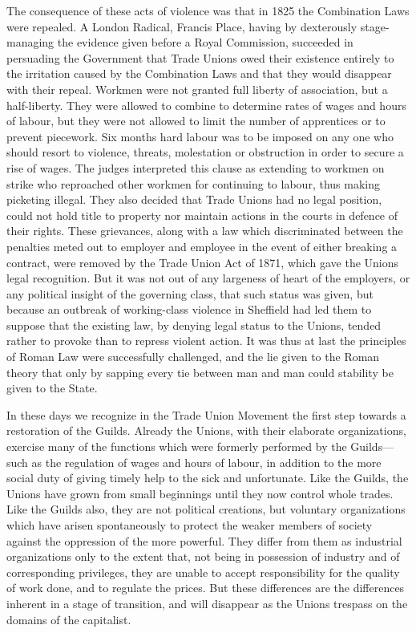 \documentclass{book}
\begin{document}
The consequence of these acts of violence was that in 1825 the Combination Laws were repealed. A London Radical, Francis Place, having by dexterously stage-managing the evidence given before a Royal Commission, succeeded in persuading the Government that Trade Unions owed their existence entirely to the irritation caused by the Combination Laws and that they would disappear with their repeal. Workmen were not granted full liberty of association, but a half-liberty. They were allowed to combine to determine rates of wages and hours of labour, but they were not allowed to limit the number of apprentices or to prevent piecework. Six months hard labour was to be imposed on any one who should resort to violence, threats, molestation or obstruction in order to secure a rise of wages. The judges interpreted this clause as extending to workmen on strike who reproached other workmen for continuing to labour, thus making picketing illegal. They also decided that Trade Unions had no legal position, could not hold title to property nor maintain actions in the courts in defence of their rights. These grievances, along with a law which discriminated between the penalties meted out to employer and employee in the event of either breaking a contract, were removed by the Trade Union Act of 1871, which gave the Unions legal recognition. But it was not out of any largeness of heart of the employers, or any political insight of the governing class, that such status was given, but because an outbreak of working-class violence in Sheffield had led them to suppose that the existing law, by denying legal status to the Unions, tended rather to provoke than to repress violent action. It was thus at last the principles of Roman Law were successfully challenged, and the lie given to the Roman theory that only by sapping every tie between man and man could stability be given to the State.

In these days we recognize in the Trade Union Movement the first step towards a restoration of the Guilds. Already the Unions, with their elaborate organizations, exercise many of the functions which were formerly performed by the Guilds—such as the regulation of wages and hours of labour, in addition to the more social duty of giving timely help to the sick and unfortunate. Like the Guilds, the Unions have grown from small beginnings until they now control whole trades. Like the Guilds also, they are not political creations, but voluntary organizations which have arisen spontaneously to protect the weaker members of society against the oppression of the more powerful. They differ from them as industrial organizations only to the extent that, not being in possession of industry and of corresponding privileges, they are unable to accept responsibility for the quality of work done, and to regulate the prices. But these differences are the differences inherent in a stage of transition, and will disappear as the Unions trespass on the domains of the capitalist.
\end{document}

